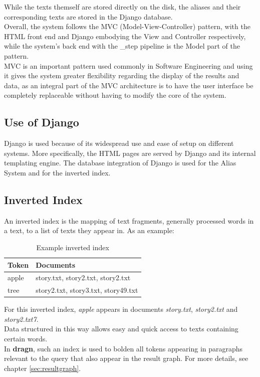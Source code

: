 While the texts themself are stored directly on the disk, the aliases and their corresponding texts are stored in the Django database.\\
Overall, the system follows the MVC (Model-View-Controller) pattern, with the HTML front end and Django embodying the View and Controller respectively, while the system's back end with the \_step pipeline is the Model part of the pattern.\\
MVC is an important pattern used commonly in Software Engineering and using it gives the system greater flexibility regarding the display of the results and data, as an integral part of the MVC architecture is to have the user interface be completely replaceable without having to modify the core of the system.

\subsection{Use of Django}
Django is used because of its widespread use and ease of setup on different systems. More specifically, the HTML pages are served by Django and its internal templating engine. The database integration of Django is used for the Alias System and for the inverted index.
\subsection{Inverted Index}
An inverted index is the mapping of text fragments, generally processed words in a text, to a list of texts they appear in. As an example:
\begin{table}[h!]
\centering
\caption{Example inverted index}
\label{table:inverted-index}
\begin{tabular}{l|l}
Token & Documents \\ \hline
apple & story.txt, story2.txt, story2.txt \\
tree & story2.txt, story3.txt, story49.txt 
\end{tabular}
\end{table}
For this inverted index, \textit{apple} appears in documents \textit{story.txt}, \textit{story2.txt} and \textit{story2.txt7}.\\
Data structured in this way allows easy and quick access to texts containing certain words.\\
In \textbf{dragn}, such an index is used to bolden all tokens appearing in paragraphs relevant to the query that also appear in the result graph. For more details, see chapter \ref{sec:resultgraph}.

